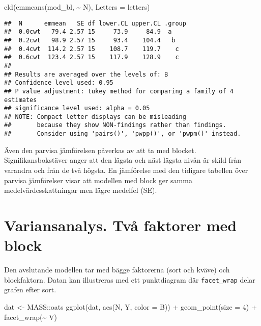\documentclass[
]{book}
\newenvironment{Shaded}{\begin{snugshade}}{\end{snugshade}}
\newcommand{\AttributeTok}[1]{\textcolor[rgb]{0.77,0.63,0.00}{#1}}
\newcommand{\DecValTok}[1]{\textcolor[rgb]{0.00,0.00,0.81}{#1}}
\newcommand{\FunctionTok}[1]{\textcolor[rgb]{0.00,0.00,0.00}{#1}}
\newcommand{\NormalTok}[1]{#1}
\newcommand{\OtherTok}[1]{\textcolor[rgb]{0.56,0.35,0.01}{#1}}
\newcommand{\SpecialCharTok}[1]{\textcolor[rgb]{0.00,0.00,0.00}{#1}}
\theoremstyle{definition}
\theoremstyle{definition}
\theoremstyle{definition}
\theoremstyle{definition}
\theoremstyle{remark}
\begin{document}
\begin{Shaded}
\begin{Highlighting}[]
\FunctionTok{cld}\NormalTok{(}\FunctionTok{emmeans}\NormalTok{(mod\_bl, }\SpecialCharTok{\textasciitilde{}}\NormalTok{ N), }\AttributeTok{Letters =}\NormalTok{ letters)}
\end{Highlighting}
\end{Shaded}

\begin{verbatim}
##  N      emmean   SE df lower.CL upper.CL .group
##  0.0cwt   79.4 2.57 15     73.9     84.9  a    
##  0.2cwt   98.9 2.57 15     93.4    104.4   b   
##  0.4cwt  114.2 2.57 15    108.7    119.7    c  
##  0.6cwt  123.4 2.57 15    117.9    128.9    c  
## 
## Results are averaged over the levels of: B 
## Confidence level used: 0.95 
## P value adjustment: tukey method for comparing a family of 4 estimates 
## significance level used: alpha = 0.05 
## NOTE: Compact letter displays can be misleading
##       because they show NON-findings rather than findings.
##       Consider using 'pairs()', 'pwpp()', or 'pwpm()' instead.
\end{verbatim}

Även den parvisa jämförelsen påverkas av att ta med blocket. Signifikansbokstäver anger att den lägsta och näst lägsta nivån är skild från varandra och från de två högsta. En jämförelse med den tidigare tabellen över parvisa jämförelser visar att modellen med block ger samma medelvärdesskattningar men lägre medelfel (SE).

\hypertarget{variansanalys.-tvuxe5-faktorer-med-block}{%
\section{Variansanalys. Två faktorer med block}\label{variansanalys.-tvuxe5-faktorer-med-block}}

Den avslutande modellen tar med bägge faktorerna (sort och kväve) och blockfaktorn. Datan kan illustreras med ett punktdiagram där \texttt{facet\_wrap} delar grafen efter sort.

\begin{Shaded}
\begin{Highlighting}[]
\NormalTok{dat }\OtherTok{\textless{}{-}}\NormalTok{ MASS}\SpecialCharTok{::}\NormalTok{oats}
\FunctionTok{ggplot}\NormalTok{(dat, }\FunctionTok{aes}\NormalTok{(N, Y, }\AttributeTok{color =}\NormalTok{ B)) }\SpecialCharTok{+}
  \FunctionTok{geom\_point}\NormalTok{(}\AttributeTok{size =} \DecValTok{4}\NormalTok{) }\SpecialCharTok{+}
  \FunctionTok{facet\_wrap}\NormalTok{(}\SpecialCharTok{\textasciitilde{}}\NormalTok{ V)}
\end{Highlighting}
\end{Shaded}
\end{document}
